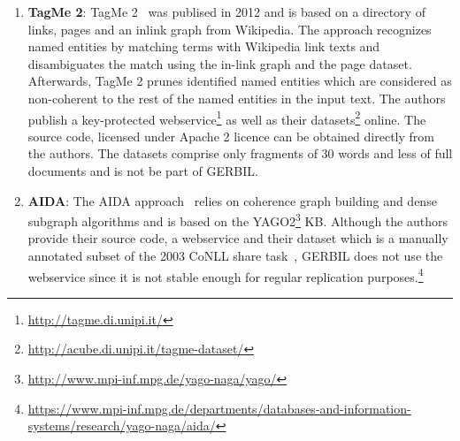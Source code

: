 \begin{enumerate}
\item \textbf{TagMe 2}: TagMe 2~\cite{TagMe2} was publised in 2012 and is based on a directory of links, pages and an inlink graph from Wikipedia.
The approach recognizes named entities by matching terms with Wikipedia link texts and disambiguates the match using the in-link graph and the page dataset.
Afterwards, TagMe 2 prunes identified named entities which are considered as non-coherent to the rest of the named entities in the input text.  
The authors publish a key-protected webservice\footnote{\url{http://tagme.di.unipi.it/}} as well as their datasets\footnote{\url{http://acube.di.unipi.it/tagme-dataset/}} online.
The source code, licensed under Apache 2 licence can be obtained directly from the authors.
The datasets comprise only fragments of 30 words and less of full documents and is not be part of GERBIL. 

\item \textbf{AIDA}: The AIDA approach~\cite{AIDA} relies on coherence graph building and dense subgraph algorithms and is based on the YAGO2\footnote{\url{http://www.mpi-inf.mpg.de/yago-naga/yago/}} \ac{KB}.
Although the authors provide their source code, a webservice and their dataset which is a manually annotated subset of the 2003 CoNLL share task~\cite{conll2003}, GERBIL does not use the webservice since it is not stable enough for regular replication purposes.\footnote{\url{https://www.mpi-inf.mpg.de/departments/databases-and-information-systems/research/yago-naga/aida/}}



\end{enumerate}
